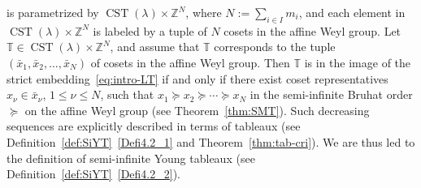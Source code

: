 \documentclass[10pt]{amsart}
\theoremstyle{definition}\newtheorem{defi}[theo]{Definition}
\theoremstyle{remark}\newtheorem{rema}[theo]{Remark}
\newcommand{\BZ}{\mathbb{Z}}
\DeclareMathOperator{\CST}{CST}
\begin{document}
is parametrized by 
$\CST (\lambda) \times \BZ^N$, 
where $N := \sum_{i \in I} m_i$, 
and each element in 
$\CST (\lambda) \times \BZ^N$
is labeled by a tuple of $N$ cosets in the affine Weyl group. 
Let $\mathbb{T} \in \CST (\lambda) \times \BZ^N$, 
and assume that $\mathbb{T}$ corresponds to the tuple 
$(\bar{x}_1 , \bar{x}_2 , \ldots , \bar{x}_N)$
of cosets in the affine Weyl group. 
Then 
$\mathbb{T}$ 
is in the image of the strict embedding~\eqref{eq:intro-LT} 
if and only if there exist coset representatives 
$x_{\nu} \in \bar{x}_{\nu}$, $1 \leq \nu \leq N$, 
such that
$x_1 \succeq x_2 \succeq \cdots \succeq x_N$ 
in the semi-infinite Bruhat order $\succeq$ on the affine Weyl group
(see Theorem~\ref{thm:SMT}). 
Such decreasing sequences are explicitly described in terms of tableaux 
(see Definition~\ref{def:SiYT}~\ref{Defi4.2_1} and Theorem~\ref{thm:tab-cri}). 
We are thus led to the definition of semi-infinite Young tableaux 
(see Definition~\ref{def:SiYT}~\ref{Defi4.2_2}).
\end{document}

